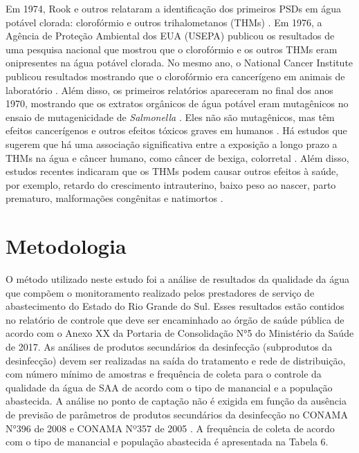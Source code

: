Em 1974, Rook e outros relataram a identificação dos primeiros PSDs em água potável clorada: clorofórmio e outros trihalometanos (THMs) \cite{rook1974}. Em 1976, a Agência de Proteção Ambiental dos EUA (USEPA) publicou os resultados de uma pesquisa nacional que mostrou que o clorofórmio e os outros THMs eram onipresentes na água potável clorada. No mesmo ano, o National Cancer Institute publicou resultados mostrando que o clorofórmio era cancerígeno em animais de laboratório \cite{national1976report}. Além disso, os primeiros relatórios apareceram no final dos anos 1970, mostrando que os extratos orgânicos de água potável eram mutagênicos no ensaio de mutagenicidade de \textit{Salmonella} \cite{loper1980mutagenic}.  Eles não são mutagênicos, mas têm efeitos cancerígenos e outros efeitos tóxicos graves em humanos \cite{Abbas2014}. Há estudos que sugerem que há uma associação significativa entre a exposição a longo prazo a THMs na água e câncer humano, como câncer de bexiga, colorretal \cite{cancerdebexiga}. Além disso, estudos recentes indicaram que os THMs podem causar outros efeitos à saúde, por exemplo, retardo do crescimento intrauterino, baixo peso ao nascer, parto prematuro, malformações congênitas e natimortos \cite{Fakhri}.











\chapter{Metodologia} \label{Metodologia}

O método utilizado neste estudo foi a análise de resultados da qualidade da água que compõem o monitoramento realizado pelos prestadores de serviço de abastecimento do Estado do Rio Grande do Sul. Esses resultados estão contidos no relatório de controle que deve ser encaminhado ao órgão de saúde pública de acordo com o Anexo XX da Portaria de Consolidação N°5 do Ministério da Saúde de 2017. As análises de produtos secundários da desinfecção (subprodutos da desinfecção) devem ser realizadas na saída do tratamento e rede de distribuição, com número mínimo de amostras e frequência de coleta para o controle da qualidade da água de SAA de acordo com o tipo de manancial e a população abastecida. A análise no ponto de captação não é exigida em função da ausência de previsão de parâmetros de produtos secundários da desinfecção no CONAMA N°396 de 2008 e CONAMA Nº357 de 2005 \cite{AnexoXX}.  A frequência de coleta de acordo com o tipo de manancial e população abastecida é apresentada na Tabela 6.
 

